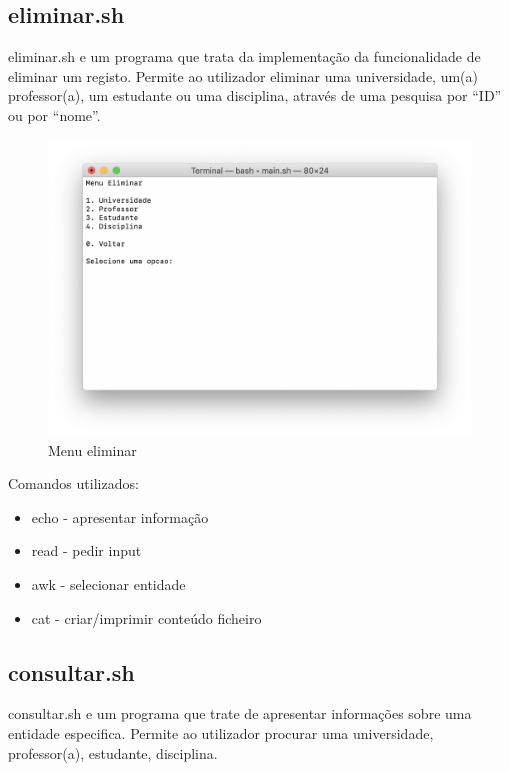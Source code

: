 \documentclass{article}
\begin{document}
\subsection{eliminar.sh}
\label{sec:org608b6d0}

eliminar.sh e um programa que trata da implementação da funcionalidade de eliminar um registo.
Permite ao utilizador eliminar uma universidade, um(a) professor(a), um estudante ou uma disciplina, através de uma pesquisa por “ID” ou por “nome”.

\begin{figure}[h]
\centering
\includegraphics[scale=0.4]{images/MenuEliminar}
\caption{Menu eliminar}
\end{figure}

Comandos utilizados:

\begin{itemize}
\item echo - apresentar informação
\item read - pedir input
\item awk - selecionar entidade
\item cat - criar/imprimir conteúdo ficheiro
\end{itemize}

\pagebreak{}
\subsection{consultar.sh}
\label{sec:orgd2facc6}

consultar.sh e um programa que trate de apresentar informações sobre uma entidade especifica.
Permite ao utilizador procurar uma universidade, professor(a), estudante, disciplina.
\end{document}
